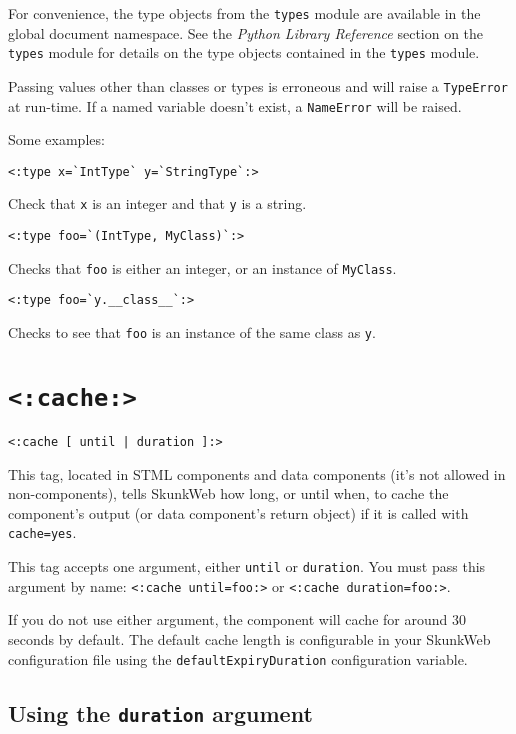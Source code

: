 \documentclass{manual}
\begin{document}
For convenience, the type objects from the \texttt{types} module
are available in the global document namespace.  See the \emph{Python
Library Reference} section on the \texttt{types} module for details
on the type objects contained in the \texttt{types} module.


Passing values other than classes or types is erroneous and will raise
a \texttt{TypeError} at run-time.  If a named variable doesn't exist, a
\texttt{NameError} will be raised.

Some examples:
\begin{verbatim}
<:type x=`IntType` y=`StringType`:>
\end{verbatim}  
Check that \texttt{x} is an integer and that \texttt{y} is a string.

\begin{verbatim}
<:type foo=`(IntType, MyClass)`:>
\end{verbatim}
Checks that \texttt{foo} is either an integer, or an instance of
\texttt{MyClass}.

\begin{verbatim}
<:type foo=`y.__class__`:>
\end{verbatim}
Checks to see that \texttt{foo} is an instance of the same class as
\texttt{y}.



\section{\texttt{<:cache:>}}
\label{tagcache}

\begin{verbatim}<:cache [ until | duration ]:>\end{verbatim}

This tag, located in STML components and data components
(it's not allowed in non-components), tells SkunkWeb how long,
or until when, to cache the component's output (or
data component's return object) if it is called with
\texttt{cache=yes}.

This tag accepts one argument, either \texttt{until}
or \texttt{duration}. You must pass this argument by name:
\texttt{<:cache until=foo:>} or
\texttt{<:cache duration=foo:>}.

If you do not use either argument, the component will cache for around
30 seconds by default. The default cache length is configurable in
your SkunkWeb configuration file using the
\texttt{defaultExpiryDuration} configuration variable.

\subsection{Using the \texttt{duration} argument}
\end{document}
